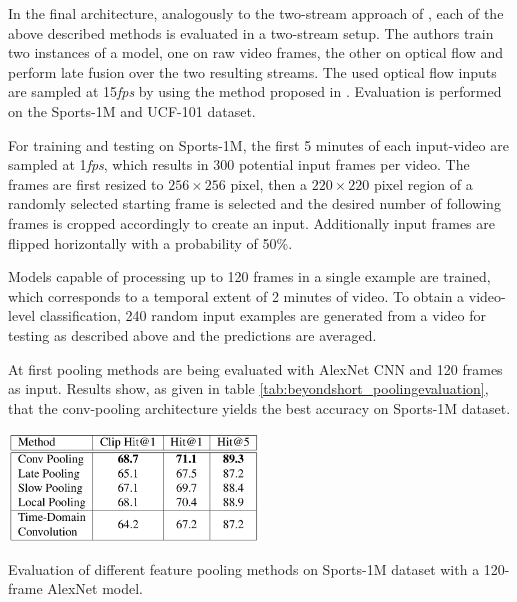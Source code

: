 In the final architecture, analogously to the two-stream approach of \textcite{simonyan_two-stream_2014}, each of the above described methods is evaluated in a two-stream setup.
The authors train two instances of a model, one on raw video frames, the other on optical flow and perform late fusion over the two resulting streams.
The used optical flow inputs are sampled at 15\textit{fps} by using the method proposed in \cite{zach_duality_2007a}.
Evaluation is performed on the Sports-1M and UCF-101 dataset.


For training and testing on Sports-1M, the first 5 minutes of each input-video are sampled at 1\textit{fps}, which results in 300 potential input frames per video.
The frames are first resized to $256\times256$ pixel, then a $220\times220$ pixel region of a randomly selected starting frame is selected and the desired number of following frames is cropped accordingly to create an input.
Additionally input frames are flipped horizontally with a probability of 50\%.

Models capable of processing up to 120 frames in a single example are trained, which corresponds to a temporal extent of 2 minutes of video.
To obtain a video-level classification, 240 random input examples are generated from a video for testing as described above and the predictions are averaged.

At first pooling methods are being evaluated with AlexNet CNN and 120 frames as input.
Results show, as given in table \ref{tab:beyondshort_poolingevaluation}, that the conv-pooling architecture yields the best accuracy on Sports-1M dataset.

\begin{table}[H]
    \centering
    \includegraphics[width=0.5\textwidth]{img_deep/beyondshort_poolingevaluation}
    \caption{Evaluation of different feature pooling methods on Sports-1M dataset with a 120-frame AlexNet model. \cite{ng_beyond_2015}}
    \label{tab:beyondshort_poolingevaluation}
\end{table}

